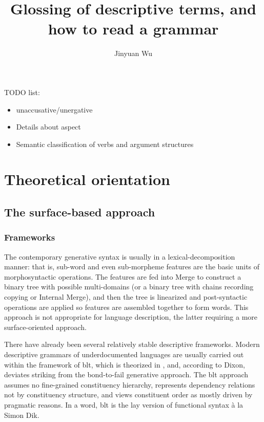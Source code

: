 \documentclass[UTF8, a4paper, oneside, scheme=plain]{ctexart}
\title{Glossing of descriptive terms, and how to read a grammar}
\author{Jinyuan Wu}
\newcommand{\ala}{à la}
\begin{document}
\maketitle

TODO list:
\begin{itemize}
    \item unaccusative/unergative
    \item Details about aspect 
    \item Semantic classification of verbs and argument structures
\end{itemize}

\section{Theoretical orientation}\label{sec:theory}

\subsection{The surface-based approach}

\subsubsection{Frameworks}

The contemporary generative syntax is usually in a lexical-decomposition manner:
that is, sub-word and even sub-morpheme features are the basic units of morphosyntactic operations.
The features are fed into Merge to construct a binary tree with possible multi-domains
(or a binary tree with chains recording copying or Internal Merge),
and then the tree is linearized and post-syntactic operations are applied 
so features are assembled together to form words.
This approach is not appropriate for language description,
the latter requiring a more surface-oriented approach.

There have already been several relatively stable descriptive frameworks.
Modern descriptive grammars of underdocumented languages 
are usually carried out within the framework of \ac{blt},
which is theorized in \citet{dixon2009basic1,dixon2010basic2,dixon2012basic3},
and, according to Dixon, deviates striking from the bond-to-fail generative approach.
The \ac{blt} approach assumes no fine-grained constituency hierarchy,
represents dependency relations not by constituency structure,
and views constituent order as mostly driven by pragmatic reasons.
In a word, \ac{blt} is the lay version of functional syntax \ala{} Simon Dik.
\end{document}
